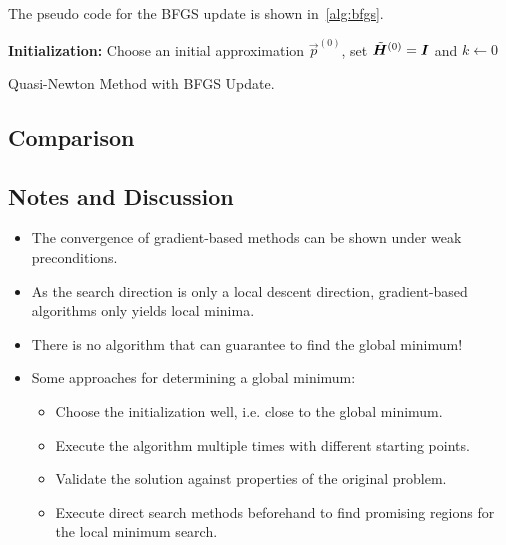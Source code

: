				The pseudo code for the BFGS update is shown in~\autoref{alg:bfgs}.

				\begin{algorithm}  \DontPrintSemicolon
					\textbf{Initialization:} Choose an initial approximation \(\vec{p}^{(0)}\), set \( \tilde{\bm{H}}^{(0)} = \bm{I} \) and \( k \gets 0 \) \;

					\caption{Quasi-Newton Method with BFGS Update.}
					\label{alg:bfgs}
				\end{algorithm}

		\subsection{Comparison} %

		\subsection{Notes and Discussion}
			\begin{itemize}
				\item The convergence of gradient-based methods can be shown under weak preconditions.
				\item As the search direction is only a local descent direction, gradient-based algorithms only yields local minima.
				\item There is no algorithm that can guarantee to find the global minimum!
				\item Some approaches for determining a global minimum:
					\begin{itemize}
						\item Choose the initialization well, i.e. close to the global minimum.
						\item Execute the algorithm multiple times with different starting points.
						\item Validate the solution against properties of the original problem.
						\item Execute direct search methods beforehand to find promising regions for the local minimum search.
					\end{itemize}
			\end{itemize}

